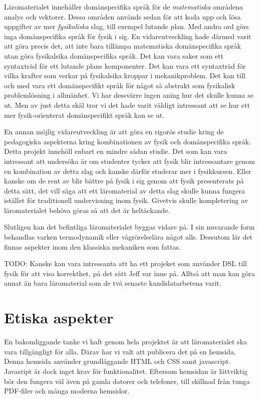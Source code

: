 \begin{binge}
Läromaterialet innehåller domänspecifika språk för de \textit{matematiska}
områdena analys och vektorer. Dessa områden används sedan för att koda upp och
lösa uppgifter av mer \textit{fysikaliska} slag, till exempel lutande plan. Med
andra ord görs inga domänspecifika språk för fysik i sig. En vidareutveckling
hade därmed varit att göra precis det, att inte bara tillämpa matematiska
domänspecifika språk utan göra fysikalsika domänspecifika språk. Det kan vara
saker som ett syntaxträd för ett lutande plans komponenter. Det kan vara ett
syntaxträd för vilka krafter som verkar på fysikalsika kroppar i mekanikproblem.
Det kan till och med vara ett domänspecifikt språk för något så abstrakt som
fysikalisk problemlösning i allmänhet. Vi har dessvärre ingen aning hur det
skulle kunna se ut. Men av just detta skäl tror vi det hade varit väldigt
intressant att se hur ett mer fysik-orienterat domänspecifikt språk kan se ut.

En annan möjlig vidareutveckling är att göra en rigorös studie kring de
pedagogiska aspekterna kring kombinationen av fysik och domänspecifika språk.
Detta projekt innehöll enbart en mindre sådan studie. Det som kan vara
intressant att undersöka är om studenter tycker att fysik blir intressantare
genom en kombination av detta slag och kanske därför studerar mer i fysikkursen.
Eller kanske om de rent av blir bättre på fysik i sig genom att fysik
presenterats på detta sätt, det vill säga att ett läromaterial av detta slag
skulle kunna fungera istället för traditionell undervisning inom fysik. Givetvis
skulle kompletering av läromaterialet behöva göras så att det är heltäckande.

Slutligen kan det befintliga läromaterialet byggas vidare på. I sin nuvarande
form behandlas varken termodynamik eller vågrörelselära något alls. Dessutom lär
det finnas aspekter inom den klassiska mekaniken som fattas.

TODO: Kanske kan vara intressanta att ha ett projeket som använder DSL till
fysik för att visa korrekthet, på det sätt Jeff var inne på. Alltså att man kan
göra annat än bara läromaterial som de två senaste kandidatarbetena varit.

\section{Etiska aspekter}

En bakomliggande tanke vi haft genom hela projektet är att läromaterialet ska
vara tillgängligt för alla. Därav har vi valt att publicera det på en hemsida.
Denna hemsida använder grundläggande HTML och CSS samt javascript. Javasript är
dock inget krav för funktionalitet. Eftersom hemsidan är lättviktig bör den
fungera väl även på gamla datorer och telefoner, till skillnad från tunga
PDF-filer och många moderna hemsidor.


\end{binge}
